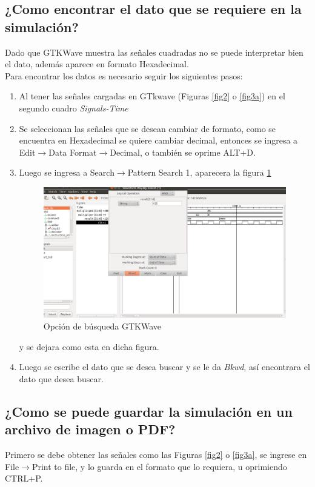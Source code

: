 \documentclass[10pt,graphicx,caption,rotating]{article}
\begin{document}
\subsection{¿Como encontrar el dato que se requiere en la simulación?}
\noindent
Dado que GTKWave muestra las señales cuadradas no se puede interpretar bien el dato, además aparece en formato Hexadecimal.\\
Para encontrar los datos es necesario seguir los siguientes pasos:
\begin{enumerate}
 \item Al tener las señales cargadas en GTkwave (Figuras \ref{fig2} o \ref{fig3a}) en el segundo cuadro \textit{Signals-Time}
 \item Se seleccionan las señales que se desean cambiar de formato, como se encuentra en Hexadecimal se quiere cambiar decimal, entonces se ingresa a Edit$\rightarrow$Data Format$\rightarrow$Decimal, o también se oprime ALT+D.
 \item Luego se ingresa a Search$\rightarrow$Pattern Search 1, aparecera la figura \ref{fig4}
\begin{figure}[H]
	\centering
		\includegraphics[scale=0.4]{4.png}
	\caption{Opción de búsqueda GTKWave}
	\label{fig4}
\end{figure}
\noindent
y se dejara como esta en dicha figura.
 \item Luego se escribe el dato que se desea buscar y se le da \textit{Bkwd}, así encontrara el dato que desea buscar.
\end{enumerate}

\subsection{¿Como se puede guardar la simulación en un archivo de imagen o PDF?}
\noindent
Primero se debe obtener las señales como las Figuras \ref{fig2} o \ref{fig3a}, se ingrese en File$\rightarrow$Print to file, y lo guarda en el formato que lo requiera, u oprimiendo CTRL+P.
\end{document}
